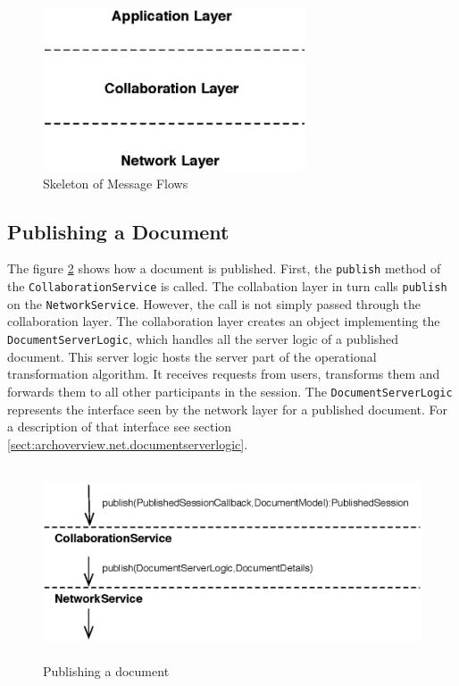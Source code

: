 \begin{figure}[H]
 \centering
 \includegraphics[width=7.80cm,height=4.87cm]{../images/finalreport/architecture_flows/skeleton.eps}
 \caption{Skeleton of Message Flows}
 \label{fig:archoverview.flow.skeleton}
\end{figure}


\subsection{Publishing a Document}
The figure \ref{fig:archoverview.flow.publish} shows how a document 
is published.
First, the \texttt{publish} method of the \texttt{Collaboration\-Service} is 
called. The collabation layer in turn calls \texttt{publish} on the
\texttt{Network\-Service}. However, the call is not simply passed through the
collaboration layer. The collaboration layer creates an object implementing
the \texttt{Document\-Server\-Logic}, which handles all the server logic of a
published document. This server logic hosts the server part of the
operational transformation algorithm. It receives requests from users, 
transforms them and forwards them to all other participants in the session.
The \texttt{Document\-Server\-Logic} represents the interface seen by the
network layer for a published document. For a description of that interface 
see section \ref{sect:archoverview.net.documentserverlogic}.

\begin{figure}[H]
 \centering
 \includegraphics[width=13.69cm,height=5.72cm]{../images/finalreport/architecture_flows/publish.eps}
 \caption{Publishing a document}
 \label{fig:archoverview.flow.publish}
\end{figure}


